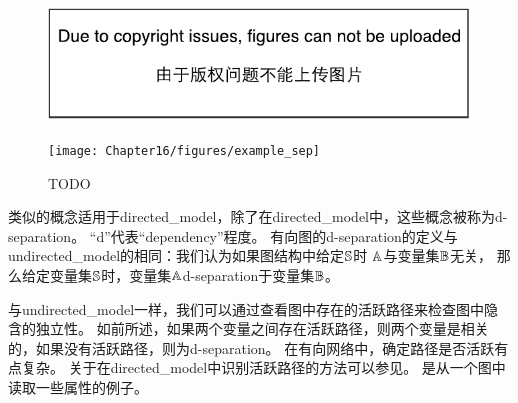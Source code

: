 \begin{figure}[!htb]
\ifOpenSource
\centerline{\includegraphics{figure.pdf}}
\else
	\centerline{\texttt{[image: Chapter16/figures/example\_sep]}}
\fi
	\caption{TODO}
	\label{fig:example_sep}
\end{figure}



类似的概念适用于\gls{directed_model}，除了在\gls{directed_model}中，这些概念被称为d-\gls{separation}。
``d''代表``\gls{dependency}''程度。
有向图的d-\gls{separation}的定义与\gls{undirected_model}的相同：我们认为如果图结构中给定$\mathbb{S}$时 $\mathbb{A}$与变量集$\mathbb{B}$无关，
那么给定变量集$\mathbb{S}$时，变量集$\mathbb{A}$d-\gls{separation}于变量集$\mathbb{B}$。


与\gls{undirected_model}一样，我们可以通过查看图中存在的活跃路径来检查图中隐含的独立性。
如前所述，如果两个变量之间存在活跃路径，则两个变量是相关的，如果没有活跃路径，则为d-\gls{separation}。
在有向网络中，确定路径是否活跃有点复杂。
关于在\gls{directed_model}中识别活跃路径的方法可以参见。 
是从一个图中读取一些属性的例子。


